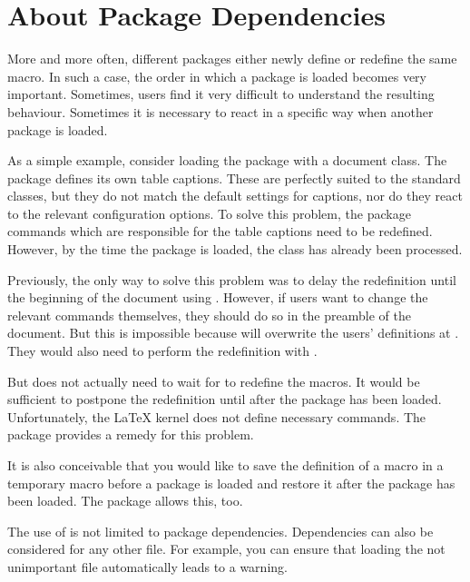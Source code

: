 \section{About Package Dependencies}
More and more often, different packages either newly define or redefine the
same macro. In such a case, the order in which a package is loaded becomes
very important. Sometimes, users find it very difficult to understand the
resulting behaviour. Sometimes it is necessary to react in a specific way when
another package is loaded.

As a simple example, consider loading the  package with a
\KOMAScript{} document class. The  package defines its own
table captions. These are perfectly suited to the standard classes, but they
do not match the default settings for \KOMAScript{} captions, nor do they
react to the relevant configuration options. To solve this problem, the
 package commands which are responsible for the table
captions need to be redefined. However, by the time the 
package is loaded, the \KOMAScript{} class has already been processed.

Previously, the only way to solve this problem was to delay the redefinition
until the beginning of the document using . However, if
users want to change the relevant commands themselves, they should do so in
the preamble of the document. But this is impossible because \KOMAScript{}
will overwrite the users' definitions at .
They would also need to perform the redefinition with .

But \KOMAScript{} does not actually need to wait for
 to redefine the macros. It would be
sufficient to postpone the redefinition until after the 
package has been loaded. Unfortunately, the \LaTeX{} kernel does not define
necessary commands. The  package provides a remedy for this
problem.

It is also conceivable that you would like to save the definition of a macro
in a temporary macro before a package is loaded and restore it after the
package has been loaded. The  package allows this, too.

The use of  is not limited to package dependencies.
Dependencies can also be considered for any other file.  For example, you can
ensure that loading the not unimportant file  automatically
leads to a warning.

